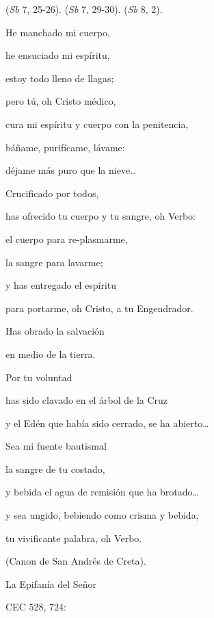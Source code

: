 	 (\emph{Sb} 7, 25-26).  (\emph{Sb} 7, 29-30).  (\emph{Sb} 8, 2).
	
	He manchado mi cuerpo,
	
	he ensuciado mi espíritu,
	
	estoy todo lleno de llagas;
	
	pero tú, oh Cristo médico,
	
	cura mi espíritu y cuerpo con la penitencia,
	
	báñame, purifícame, lávame:
	
	déjame más puro que la nieve\ldots{}
	
	Crucificado por todos,
	
	has ofrecido tu cuerpo y tu sangre, oh Verbo:
	
	el cuerpo para re-plasmarme,
	
	la sangre para lavarme;
	
	y has entregado el espíritu
	
	para portarme, oh Cristo, a tu Engendrador.
	
	Has obrado la salvación
	
	en medio de la tierra.
	
	Por tu voluntad
	
	has sido clavado en el árbol de la Cruz
	
	y el Edén que había sido cerrado, se ha abierto\ldots{}
	
	Sea mi fuente bautismal
	
	la sangre de tu costado,
	
	y bebida el agua de remisión que ha brotado\ldots{}
	
	y sea ungido, bebiendo como crisma y bebida,
	
	tu vivificante palabra, oh Verbo.
	
	(Canon de San Andrés de Creta).
	
	
	La Epifanía del Señor
	
	CEC 528, 724:
	
